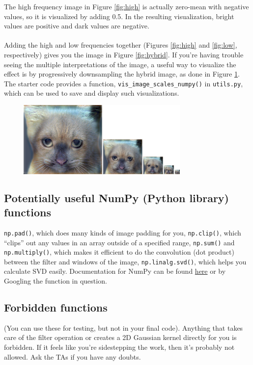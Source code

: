 \documentclass{article}
\begin{document}
\noindent
The high frequency image in Figure \ref{fig:high} is actually zero-mean with negative values, so it is visualized by adding 0.5. In the resulting visualization, bright values are positive and dark values are negative.
\\
\\
Adding the high and low frequencies together (Figures \ref{fig:high} and \ref{fig:low}, respectively) gives you the image in Figure \ref{fig:hybrid}. If you're having trouble seeing the multiple interpretations of the image, a useful way to visualize the effect is by progressively downsampling the hybrid image, as done in Figure \ref{fig:scales}. The starter code provides a function, \lstinline{vis_image_scales_numpy()} in \lstinline{utils.py}, which can be used to save and display such visualizations.

\begin{figure}[ht]
    \centering
    \includegraphics[width=0.75\textwidth]{images/cat_hybrid_image_scales.jpg}
    \caption{}
    \label{fig:scales}
\end{figure}

\subsection*{Potentially useful NumPy (Python library) functions}
\lstinline{np.pad()}, which does many kinds of image padding for you, \lstinline{np.clip()}, which ``clips'' out any values in an array outside of a specified range, \lstinline{np.sum()} and \lstinline{np.multiply()}, which makes it efficient to do the convolution (dot product) between the filter and windows of the image, \lstinline{np.linalg.svd()}, which helps you calculate SVD easily. Documentation for NumPy can be found \href{https://docs.scipy.org/doc/numpy/}{here} or by Googling the function in question.

\subsection*{Forbidden functions}
(You can use these for testing, but not in your final code). Anything that takes care of the filter operation or creates a 2D Gaussian kernel directly for you is forbidden. If it feels like you're sidestepping the work, then it's probably not allowed. Ask the TAs if you have any doubts.
\end{document}
